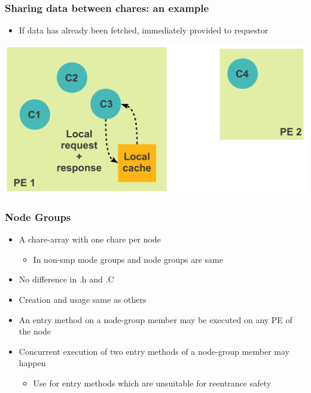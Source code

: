 \begin{frame}[fragile]
  \frametitle{Sharing data between chares: an example}
  \begin{itemize}
    \item If data has already been fetched, immediately provided to requestor
  \end{itemize}
  \includegraphics[width=\textwidth]{figures/advancedOpts/fig8}
\end{frame}

\begin{frame}[fragile]
  \frametitle{Node Groups}
  \begin{itemize}
    \item A chare-array with one chare per node
    \begin{itemize}
      \item In non-smp mode groups and node groups are same
    \end{itemize}
    \item No difference in .h and .C
    \item Creation and usage same as others
    \item An entry method on a node-group member may be executed on any PE of the node
    \item Concurrent execution of two entry methods of a node-group member may happen
    \begin{itemize}
      \item Use \code{[exclusive]} for entry methods which are unsuitable for reentrance safety
    \end{itemize}
  \end{itemize}
\end{frame}

